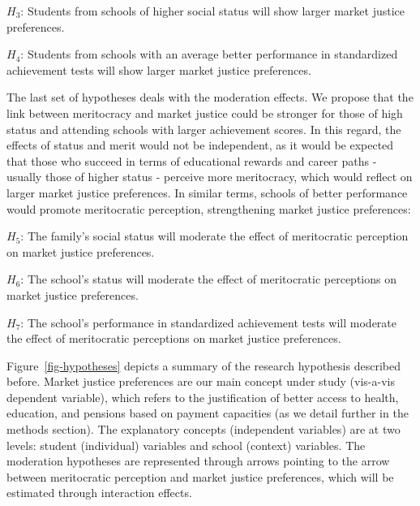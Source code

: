 \documentclass[
  12pt,
  letterpaper,
]{article}
\begin{document}
\(H_3\): Students from schools of higher social status will show larger
market justice preferences.

\(H_4\): Students from schools with an average better performance in
standardized achievement tests will show larger market justice
preferences.

The last set of hypotheses deals with the moderation effects. We propose
that the link between meritocracy and market justice could be stronger
for those of high status and attending schools with larger achievement
scores. In this regard, the effects of status and merit would not be
independent, as it would be expected that those who succeed in terms of
educational rewards and career paths - usually those of higher status -
perceive more meritocracy, which would reflect on larger market justice
preferences. In similar terms, schools of better performance would
promote meritocratic perception, strengthening market justice
preferences:

\(H_5\): The family's social status will moderate the effect of
meritocratic perception on market justice preferences.

\(H_6\): The school's status will moderate the effect of meritocratic
perceptions on market justice preferences.

\(H_7\): The school's performance in standardized achievement tests will
moderate the effect of meritocratic perceptions on market justice
preferences.

Figure~\ref{fig-hypotheses} depicts a summary of the research hypothesis
described before. Market justice preferences are our main concept under
study (vis-a-vis dependent variable), which refers to the justification
of better access to health, education, and pensions based on payment
capacities (as we detail further in the methods section). The
explanatory concepts (independent variables) are at two levels: student
(individual) variables and school (context) variables. The moderation
hypotheses are represented through arrows pointing to the arrow between
meritocratic perception and market justice preferences, which will be
estimated through interaction effects.
\end{document}
